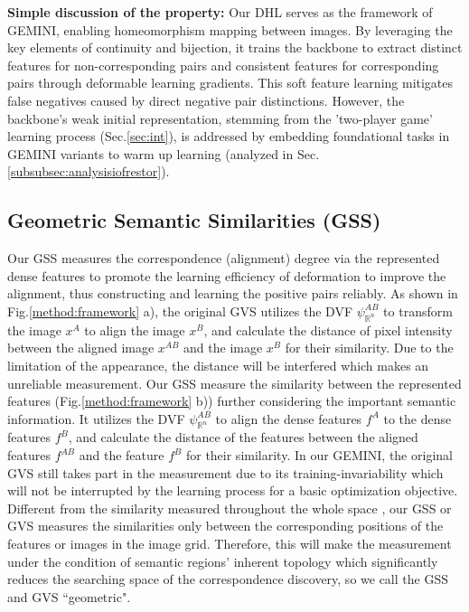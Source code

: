 \textbf{Simple discussion of the property:} Our DHL serves as the framework of GEMINI, enabling homeomorphism mapping between images. By leveraging the key elements of continuity and bijection, it trains the backbone to extract distinct features for non-corresponding pairs and consistent features for corresponding pairs through deformable learning gradients. This soft feature learning mitigates false negatives caused by direct negative pair distinctions. However, the backbone's weak initial representation, stemming from the 'two-player game' learning process (Sec.\ref{sec:int}), is addressed by embedding foundational tasks in GEMINI variants to warm up learning (analyzed in Sec.\ref{subsubsec:analysisiofrestor}).

\subsection{Geometric Semantic Similarities (GSS)}
\label{sec:gss}
Our GSS measures the correspondence (alignment) degree via the represented dense features to promote the learning efficiency of deformation to improve the alignment, thus constructing and learning the positive pairs reliably. As shown in Fig.\ref{method:framework} a), the original GVS \cite{He_2023_CVPR} utilizes the DVF $\psi^{AB}_{\mathbb{R}^{n}}$ to transform the image $x^{A}$ to align the image $x^{B}$, and calculate the distance of pixel intensity between the aligned image $x^{AB}$ and the image $x^{B}$ for their similarity. Due to the limitation of the appearance, the distance will be interfered which makes an unreliable measurement. Our GSS measure the similarity between the represented features (Fig.\ref{method:framework} b)) further considering the important semantic information. It utilizes the DVF $\psi^{AB}_{\mathbb{R}^{n}}$ to align the dense features $f^{A}$ to the dense features $f^{B}$, and calculate the distance of the features between the aligned features $f^{AB}$ and the feature $f^{B}$ for their similarity. In our GEMINI, the original GVS still takes part in the measurement due to its training-invariability which will not be interrupted by the learning process for a basic optimization objective. Different from the similarity measured throughout the whole space \cite{wang2022densecl}, our GSS or GVS measures the similarities only between the corresponding positions of the features or images in the image grid. Therefore, this will make the measurement under the condition of semantic regions' inherent topology which significantly reduces the searching space of the correspondence discovery, so we call the GSS and GVS ``geometric".

